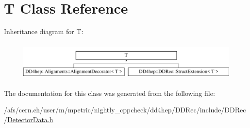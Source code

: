 \hypertarget{class_t}{}\section{T Class Reference}
\label{class_t}
Inheritance diagram for T\+:\begin{figure}[H]
\begin{center}
\leavevmode
\includegraphics[height=1.985816cm]{class_t}
\end{center}
\end{figure}


The documentation for this class was generated from the following file\+:\begin{DoxyCompactItemize}
\item 
/afs/cern.\+ch/user/m/mpetric/nightly\+\_\+cppcheck/dd4hep/\+D\+D\+Rec/include/\+D\+D\+Rec/\hyperlink{_detector_data_8h}{Detector\+Data.\+h}\end{DoxyCompactItemize}
